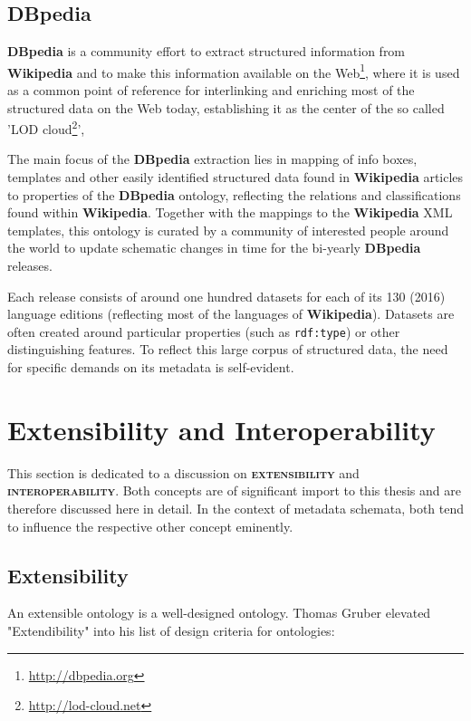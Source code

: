 \documentclass[a4paper,english,twoside,BCOR1.5cm,headsepline,DIV12,appendixprefix,final,12pt]{scrbook}
\newcommand{\extensibility}{{\ttfamily\scshape\bfseries extensibility}\xspace}
\newcommand{\interoperability}{{\ttfamily\scshape\bfseries interoperability}\xspace}
\newcommand{\dbpedia}{{\ttfamily\bfseries DBpedia}\xspace}
\newcommand{\wikipedia}{{\ttfamily\bfseries Wikipedia}\xspace}
\newcommand{\prop}[1]{{{\texttt{#1}}}}
\newcommand\footnoteurl[1]{\footnote{\scriptsize\url{#1}}}
\begin{document}
\subsection{DBpedia}
\label{sec:dbpedia}

\dbpedia is a community effort to extract structured information from \wikipedia and to make this information available on the Web\footnoteurl{http://dbpedia.org}, where it is used as a common point of reference for interlinking and enriching most of the structured data on the Web today, establishing it as the center of the so called 'LOD cloud\footnoteurl{http://lod-cloud.net}',

The main focus of the \dbpedia extraction lies in mapping of info boxes, templates and other easily identified structured data found in \wikipedia articles to properties of the \dbpedia ontology, reflecting the relations and classifications found within \wikipedia \cite{dbpedia}. Together with the mappings to the \wikipedia XML templates, this ontology is curated by a community of interested people around the world to update schematic changes in time for the bi-yearly \dbpedia releases. 

Each release consists of around one hundred datasets for each of its 130 (2016) language editions (reflecting most of the languages of \wikipedia). Datasets are often created around particular properties (such as \prop{rdf:type}) or other distinguishing features. To reflect this large corpus of structured data, the need for specific demands on its metadata is self-evident.


\section{Extensibility and Interoperability} 
\label{sec:extensinter}

This section is dedicated to a discussion on \extensibility and \interoperability. Both concepts are of significant import to this thesis and are therefore discussed here in detail. In the context of metadata schemata, both tend to influence the respective other concept eminently.

\subsection{Extensibility}
\label{sec:extensibility}

An extensible ontology is a well-designed ontology. Thomas Gruber elevated "Extendibility"  into his list of design criteria for ontologies:
\end{document}
